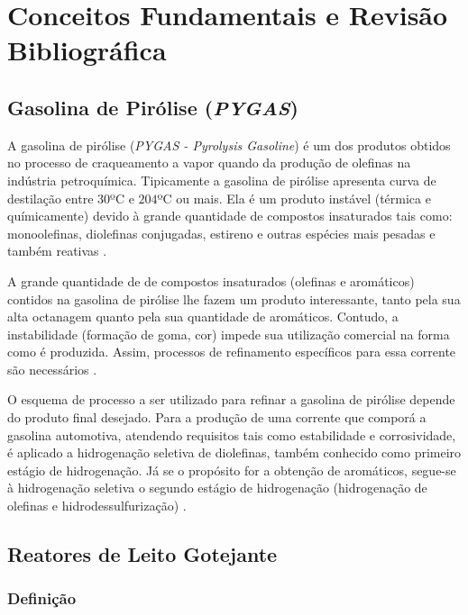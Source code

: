 %
\chapter{Conceitos Fundamentais e Revisão Bibliográfica}
\label{chap:revisaobibliografica}

\section{Gasolina de Pirólise (\emph{PYGAS})} \label{sec:pygas}
A gasolina de pirólise (\emph{PYGAS - Pyrolysis Gasoline}) é um dos produtos
obtidos no processo de craqueamento a vapor quando da produção de olefinas na
indústria petroquímica. Tipicamente a gasolina de pirólise apresenta curva de
destilação entre $30$\si{ºC} e $204$\si{ºC} ou mais. Ela é um produto instável
(térmica e químicamente) devido à grande quantidade de compostos insaturados
tais como: monoolefinas, diolefinas conjugadas, estireno e outras espécies mais
pesadas e também reativas \cite{Cheng1986}.
 
A grande quantidade de de compostos insaturados (olefinas e aromáticos) contidos
na gasolina de pirólise lhe fazem um produto interessante, tanto pela
sua alta octanagem quanto pela sua quantidade de aromáticos. Contudo, a
instabilidade (formação de goma, cor) impede sua utilização comercial na forma como é produzida. Assim,
processos de refinamento específicos para essa corrente são necessários
\cite{Derrien1986}.

O esquema de processo a ser utilizado para refinar a gasolina de pirólise
depende do produto final desejado. Para a produção de uma corrente que
comporá a gasolina automotiva, atendendo requisitos tais como estabilidade e
corrosividade, é aplicado a hidrogenação seletiva de diolefinas, também
conhecido como primeiro estágio de hidrogenação. Já se o propósito for a
obtenção de aromáticos, segue-se à hidrogenação seletiva o segundo estágio
de hidrogenação (hidrogenação de olefinas e hidrodessulfurização)
\cite{Derrien1986}.

\section{Reatores de Leito Gotejante} \label{sec:reatorestbr}

\subsection{Definição} \label{sec:definicao}

